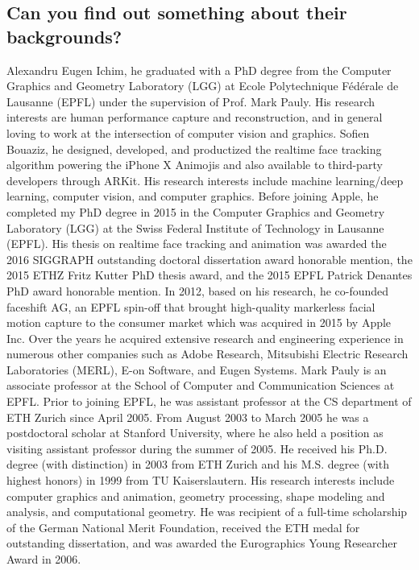 \documentclass[12pt,a4paper,titlepage]{article}
\begin{document}
{\subsection{Can you find out something about their backgrounds?}{
Alexandru Eugen Ichim, he graduated with a PhD degree from the Computer Graphics and Geometry Laboratory (LGG) at Ecole Polytechnique Fédérale de Lausanne (EPFL) under the supervision of Prof. Mark Pauly. His research interests are human performance capture and reconstruction, and in general loving to work at the intersection of computer vision and graphics.\newline
Sofien Bouaziz, he designed, developed, and productized the realtime face tracking algorithm powering the iPhone X Animojis and also available to third-party developers through ARKit. His research interests include machine learning/deep learning, computer vision, and computer graphics.\newline
Before joining Apple, he completed my PhD degree in 2015 in the Computer Graphics and Geometry Laboratory (LGG) at the Swiss Federal Institute of Technology in Lausanne (EPFL). His thesis on realtime face tracking and animation was awarded the 2016 SIGGRAPH outstanding doctoral dissertation award honorable mention, the 2015 ETHZ Fritz Kutter PhD thesis award, and the 2015 EPFL Patrick Denantes PhD award honorable mention. In 2012, based on his research, he co-founded faceshift AG, an EPFL spin-off that brought high-quality markerless facial motion capture to the consumer market which was acquired in 2015 by Apple Inc. Over the years he acquired extensive research and engineering experience in numerous other companies such as Adobe Research, Mitsubishi Electric Research Laboratories (MERL), E-on Software, and Eugen Systems. \newline
Mark Pauly is an associate professor at the School of Computer and Communication Sciences at EPFL. Prior to joining EPFL, he was assistant professor at the CS department of ETH Zurich since April 2005. From August 2003 to March 2005 he was a postdoctoral scholar at Stanford University, where he also held a position as visiting assistant professor during the summer of 2005. He received his Ph.D. degree (with distinction) in 2003 from ETH Zurich and his M.S. degree (with highest honors) in 1999 from TU Kaiserslautern. His research interests include computer graphics and animation, geometry processing, shape modeling and analysis, and computational geometry. He was recipient of a full-time scholarship of the German National Merit Foundation, received the ETH medal for outstanding dissertation, and was awarded the Eurographics Young Researcher Award in 2006.
}
}\label{sec:q2sec}
\end{document}
